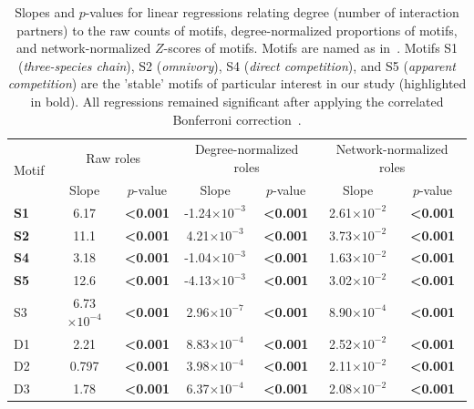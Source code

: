 \documentclass[12pt]{article}
\begin{document}
\begin{spacing}{2.0}
    \begin{table}[h!]
        \caption{Slopes and $p$-values for linear regressions relating degree (number of interaction partners) to the raw counts of motifs, degree-normalized proportions of motifs, and network-normalized $Z$-scores of motifs. Motifs are named as in~\citet{Stouffer2007}. Motifs S1 (\emph{three-species chain}), S2 (\emph{omnivory}), S4 (\emph{direct competition}), and S5 (\emph{apparent competition}) are the 'stable' motifs of particular interest in our study (highlighted in bold). All regressions remained significant after applying the correlated Bonferroni correction~\citep{Drezner2016}.}
        \label{degree_lms}
        \begin{tabular}{l | c c c c c c }
        \multirow{2}{*}{Motif} & \multicolumn{2}{c}{Raw roles} & \multicolumn{2}{c}{Degree-normalized roles} & \multicolumn{2}{c}{Network-normalized roles} \\
        & Slope & $p$-value & Slope & $p$-value & Slope & $p$-value \\
        \hline
        \textbf{S1}	&	6.17	&	\textbf{\textless0.001}	& -1.24$\times10^{-3}$	&	\textbf{\textless0.001}	&	2.61$\times10^{-2}$	&	\textbf{\textless0.001}	\\
        \textbf{S2}	&	11.1	&	\textbf{\textless0.001}	& 4.21$\times10^{-3}$	&	\textbf{\textless0.001}	&	3.73$\times10^{-2}$	&	\textbf{\textless0.001}	\\
        \textbf{S4}	&	3.18	&	\textbf{\textless0.001}	& -1.04$\times10^{-3}$	&	\textbf{\textless0.001}	&	1.63$\times10^{-2}$	&	\textbf{\textless0.001}	\\
        \textbf{S5}	&	12.6	&	\textbf{\textless0.001}	& -4.13$\times10^{-3}$	&	\textbf{\textless0.001}	&	3.02$\times10^{-2}$	&	\textbf{\textless0.001}	\\
        \hline
        S3	&	6.73$\times10^{-4}$	&	\textbf{\textless0.001}	&	2.96$\times10^{-7}$	&	\textbf{\textless0.001}	&	8.90$\times10^{-4}$	&	\textbf{\textless0.001}	\\
        D1	&	2.21	&	\textbf{\textless0.001}	&	8.83$\times10^{-4}$	&	\textbf{\textless0.001}	&	2.52$\times10^{-2}$	&	\textbf{\textless0.001}	\\
        D2	&	0.797	&	\textbf{\textless0.001}	&	3.98$\times10^{-4}$	&	\textbf{\textless0.001}	&	2.11$\times10^{-2}$
        	&	\textbf{\textless0.001}	\\
        D3	&	1.78	&	\textbf{\textless0.001}	&	6.37$\times10^{-4}$	&	\textbf{\textless0.001}	&	2.08$\times10^{-2}$	&	\textbf{\textless0.001}	\\

\end{tabular}
\end{table}
\end{spacing}
\end{document}
